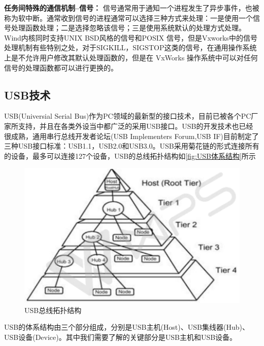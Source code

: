 \textbf{任务间特殊的通信机制--信号：} 信号通常用于通知一个进程发生了异步事件，也被称为软中断。通常收到信号的进程通常可以选择三种方式来处理：一是使用一个信号处理函数处理；二是选择忽略该信号；三是使用系统默认的处理方式处理。
Wind内核同时支持UNIX BSD风格的信号和POSIX 信号，但是Vxworks中的信号处理机制有些特别之处，对于SIGKILL，SIGSTOP这类的信号，在通用操作系统上是不允许用户修改其默认处理函数的，但是在 VxWorks 操作系统中可以对任何信号的处理函数都可以进行更换的。



\subsection{USB技术}
	USB(Universial Serial Bus)作为PC领域的最新型的接口技术，目前已被各个PC厂家所支持，并且在各类外设当中都广泛的采用USB接口。USB的开发技术也已经很成熟，通用串行总线开发者论坛(USB Implementers Forum,USB IF)目前制定了三种USB接口标准：USB1.1，USB2.0和USB3.0。USB采用菊花链的形式连接所有的设备，最多可以连接127个设备，USB的总线拓扑结构如\autoref{fig:USB体系结构}所示
\begin{figure}[!h]
\centering
\includegraphics[width=1.0\textwidth]{./graphics/usb-structure.pdf}
\caption{USB总线拓扑结构}\label{fig:USB体系结构}
\end{figure}


USB的体系结构由三个部分组成，分别是USB主机(Host)、USB集线器(Hub)、USB设备(Device)。其中我们需要了解的关键部分是USB主机和USB设备。
	

